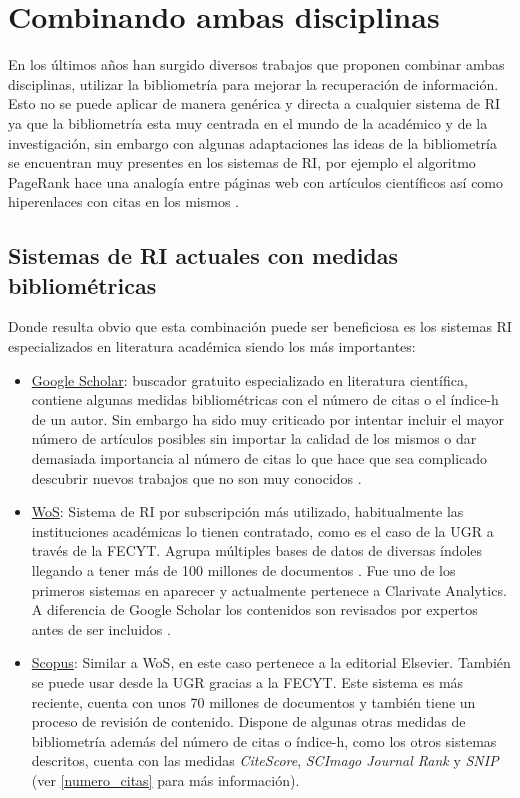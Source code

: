 \section{Combinando ambas disciplinas}

En los últimos años han surgido diversos trabajos que proponen combinar ambas disciplinas, utilizar la bibliometría para mejorar la recuperación de información. Esto no se puede aplicar de manera genérica y directa a cualquier sistema de \acrshort{RI} ya que la bibliometría esta muy centrada en el mundo de la académico y de la investigación, sin embargo con algunas adaptaciones las ideas de la bibliometría se encuentran muy presentes en los sistemas de \acrshort{RI}, por ejemplo el algoritmo PageRank hace una analogía entre páginas web con artículos científicos así como hiperenlaces con citas en los mismos \cite{PageRankPaper}. 

\subsection{Sistemas de \acrshort{RI} actuales con medidas bibliométricas}
Donde resulta obvio que esta combinación puede ser beneficiosa es los sistemas \acrshort{RI} especializados en literatura académica siendo los más importantes:

\begin{itemize}
	\item \href{https://scholar.google.es/}{Google Scholar}: buscador gratuito especializado en literatura científica, contiene algunas medidas bibliométricas con el número de citas o el índice-h de un autor. Sin embargo ha sido muy criticado por intentar incluir el mayor número de artículos posibles sin importar la calidad de los mismos \cite{googleScholarJunk} o dar demasiada importancia al número de citas lo que hace que sea complicado descubrir nuevos trabajos que no son muy conocidos \cite{Beel09}.
	
	\item \href{http://wos.fecyt.es/}{\acrfull{WoS}}: Sistema de RI por subscripción más utilizado, habitualmente las instituciones académicas lo tienen contratado, como es el caso de la \acrlong{UGR} a través de la \acrfull{FECYT}. Agrupa múltiples bases de datos de diversas índoles llegando a tener más de 100 millones de documentos \cite{WoS_Facts}. Fue uno de los primeros sistemas en aparecer y actualmente pertenece a Clarivate Analytics. A diferencia de Google Scholar los contenidos son revisados por expertos antes de ser incluidos \cite{WoS_Facts}. 
	
	\item \href{https://www.scopus.com/}{Scopus}: Similar a \acrshort{WoS}, en este caso pertenece a la editorial Elsevier. También se puede usar desde la \acrshort{UGR} gracias a la \acrshort{FECYT}. Este sistema es más reciente, cuenta con unos 70 millones de documentos \cite{scopus} y también tiene un proceso de revisión de contenido. Dispone de algunas otras medidas de bibliometría además del número de citas o índice-h, como los otros sistemas descritos, cuenta con las medidas \textit{CiteScore}, \textit{SCImago Journal Rank} y \textit{SNIP} (ver \ref{numero_citas} para más información). 
\end{itemize}

